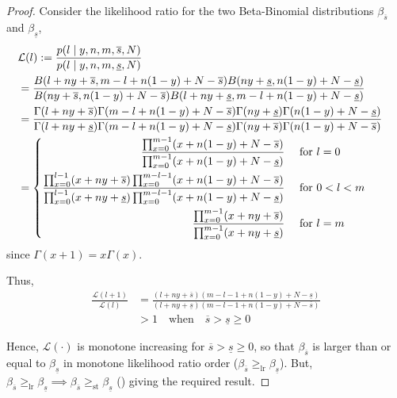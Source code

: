 \documentclass[12pt, a4paper]{elsarticle}
\newcommand{\ul}[1]{\underline{#1}}
\newcommand{\ol}[1]{\overline{#1}}
\begin{document}
\begin{proof}%
  \label{prf:s}
  Consider the likelihood ratio for the two Beta-Binomial distributions $\beta_{\ol{s}}$ and $\beta_{\ul{s}}$,
  \begin{align*}
    \lefteqn{\mathcal{L}(l) := \frac{p(l \mid y, n, m, \ol{s}, N)}{p(l \mid y, n, m, \ul{s}, N)}} \\
    &= \frac{B(l + n y + \ol{s}, m - l + n (1 - y) + N - \ol{s}) B(    n y + \ul{s},         n (1 - y) + N - \ul{s})}
            {B(    n y + \ol{s},         n (1 - y) + N - \ol{s}) B(l + n y + \ul{s}, m - l + n (1 - y) + N - \ul{s})} \\
    &= \frac{\Gamma(l + n y + \ol{s}) \Gamma(m - l + n (1 - y) + N - \ol{s}) \Gamma(n y + \ul{s}) \Gamma(n (1 - y) + N - \ul{s})}
            {\Gamma(l + n y + \ul{s}) \Gamma(m - l + n (1 - y) + N - \ul{s}) \Gamma(n y + \ol{s}) \Gamma(n (1 - y) + N - \ol{s})} \\
    &= \left\{ \begin{aligned}
         \frac{\prod_{x=0}^{m-1} (x + n (1 - y) + N - \ol{s})}
              {\prod_{x=0}^{m-1} (x + n (1 - y) + N - \ul{s})} &\quad\mbox{ for } l=0 \\
         \frac{\prod_{x=0}^{l-1} (x + n y + \ol{s}) \prod_{x=0}^{m-l-1} (x + n (1 - y) + N - \ol{s})}
              {\prod_{x=0}^{l-1} (x + n y + \ul{s}) \prod_{x=0}^{m-l-1} (x + n (1 - y) + N - \ul{s})} &\quad\mbox{ for } 0<l<m \\
         \frac{\prod_{x=0}^{m-1} (x + n y + \ol{s})}
              {\prod_{x=0}^{m-1} (x + n y + \ul{s})} &\quad\mbox{ for } l=m
       \end{aligned} \right.
  \end{align*}
  since $\Gamma(x+1)=x \Gamma(x)$.
  
  Thus,
  \begin{align*}
    \frac{\mathcal{L}(l+1)}{\mathcal{L}(l)} &=
      \frac{(l + n y + \ol{s}) (m - l - 1 + n (1 - y) + N - \ul{s})}
           {(l + n y + \ul{s}) (m - l - 1 + n (1 - y) + N - \ol{s})} \\
    &> 1 \quad\mbox{when}\quad \ol{s} > \ul{s} \ge 0
  \end{align*}
    
Hence, $\mathcal{L}(\cdot)$ is monotone increasing for $\ol{s} > \ul{s} \ge 0$,
so that $\beta_{\ol{s}}$ is larger than or equal to $\beta_{\ul{s}}$ in monotone likelihood ratio order
($\beta_{\ol{s}} \ge_\mathrm{lr} \beta_{\ul{s}}$).
But, $\beta_{\ol{s}} \ge_\mathrm{lr} \beta_{\ul{s}} \implies \beta_{\ol{s}} \ge_\mathrm{st} \beta_{\ul{s}}$
(\cite[Theorem 1.C.1, p.43]{shaked2007}) giving the required result.
\end{proof}
\end{document}
